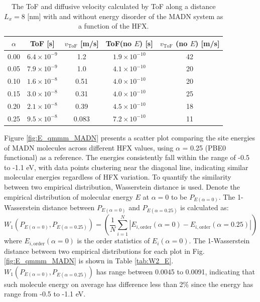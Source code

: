 \documentclass[letterpaper,12pt]{article}
\begin{document}
\begin{table}[H]
    \centering
    \begin{tabular}{c c c c c}
    \hline
        $\alpha$ & ToF [s] & $v_\text{ToF}$ [m/s] & ToF(no $E$) [s] & $v_\text{ToF}$ (no $E$) [m/s] \\
    \hline
        0.00 &  $6.4 \times 10^{-9}$ & 1.2 & $1.9 \times 10^{-10}$ & 42 \\
        0.05 & $ 7.9 \times 10^{-9}$ & 1.0 & $4.1 \times 10^{-10}$ & 20 \\
        0.10 & $ 1.6 \times 10^{-8}$ & 0.51 & $4.0 \times 10^{-10} $ & 20 \\
        0.15 & $ 3.0 \times 10^{-8}$ & 0.31 & $4.0 \times 10^{-10} $ & 25 \\
        0.20 & $ 2.1 \times 10^{-8}$ & 0.39 & $4.5 \times 10^{-10}$ & 18 \\
        0.25 & $ 9.5 \times 10^{-8}$ & 0.083 & $7.2 \times 10^{-10}$ & 11 \\
    \hline
    \end{tabular}
    \caption{The ToF and diffusive velocity calculated by ToF along a distance $L_x = 8$ [nm] with and without energy disorder of the MADN system as a function of the HFX. }
    \label{tab:ToF_MADN_HFX}
\end{table}

Figure \ref{fig:E_qmmm_MADN} presents a scatter plot comparing the site energies of MADN molecules across different HFX values, using $\alpha$ = 0.25 (PBE0 functional) as a reference. The energies consistently fall within the range of -0.5 to -1.1 eV, with data points clustering near the diagonal line, indicating similar molecular energies regardless of HFX variation.
To quantify the similarity between two empirical distribution, Wasserstein distance is used.
Denote the empirical distribution of molecular energy $E$ at $\alpha=0$ to be $P_{E(\alpha=0)}$. 
The 1-Wasserstein distance between $P_{E(\alpha=0)}$ and $P_{E(\alpha=0.25)}$ is calculated as:
\begin{equation}
    W_1 (P_{E(\alpha=0)}, P_{E(\alpha=0.25)}) = (\frac{1}{N} \sum\limits_{i=1}^N | E_{i,\text{order}}(\alpha=0) - E_{i,\text{order}}(\alpha=0.25) |)
\end{equation}
where $E_{i,\text{order}}(\alpha=0)$ is the order statistics of $E_i(\alpha=0)$. The 1-Wasserstein distance between two empirical distributions for each plot in Fig. \ref{fig:E_qmmm_MADN} is shown in Table \ref{tab:W2_E}. $W_1 (P_{E(\alpha=0)}, P_{E(\alpha=0.25)})$ has range between 0.0045 to 0.0091, indicating that such molecule energy on average has difference less than 2\% since the energy has range from -0.5 to -1.1 eV.
\end{document}
